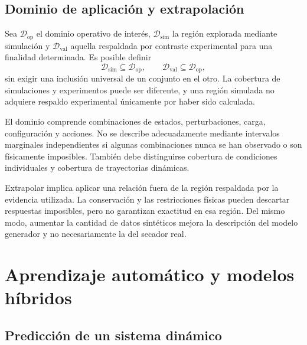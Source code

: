 \subsection{Dominio de aplicación y extrapolación}
\label{subsec:dominio_operacional_validez}

Sea $\mathcal D_{\mathrm{op}}$ el dominio operativo de interés, $\mathcal D_{\mathrm{sim}}$ la región explorada mediante simulación y $\mathcal D_{\mathrm{val}}$ aquella respaldada por contraste experimental para una finalidad determinada. Es posible definir
\begin{equation}
\mathcal D_{\mathrm{sim}}\subseteq\mathcal D_{\mathrm{op}},
\qquad
\mathcal D_{\mathrm{val}}\subseteq\mathcal D_{\mathrm{op}},
\label{eq:dominios_modelo}
\end{equation}
sin exigir una inclusión universal de un conjunto en el otro. La cobertura de simulaciones y experimentos puede ser diferente, y una región simulada no adquiere respaldo experimental únicamente por haber sido calculada.

El dominio comprende combinaciones de estados, perturbaciones, carga, configuración y acciones. No se describe adecuadamente mediante intervalos marginales independientes si algunas combinaciones nunca se han observado o son físicamente imposibles. También debe distinguirse cobertura de condiciones individuales y cobertura de trayectorias dinámicas.

Extrapolar implica aplicar una relación fuera de la región respaldada por la evidencia utilizada. La conservación y las restricciones físicas pueden descartar respuestas imposibles, pero no garantizan exactitud en esa región. Del mismo modo, aumentar la cantidad de datos sintéticos mejora la descripción del modelo generador y no necesariamente la del secador real.

\section{Aprendizaje automático y modelos híbridos}
\label{sec:ml_procesos_termicos}

\subsection{Predicción de un sistema dinámico}

